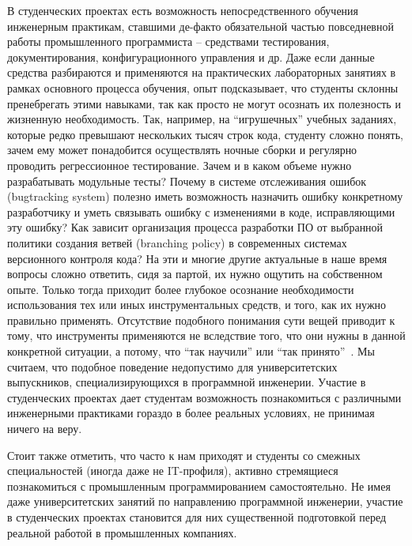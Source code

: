 \documentclass[a5paper]{article}
\begin{document}
В студенческих проектах есть возможность непосредственного обучения инженерным практикам, ставшими де-факто обязательной частью повседневной работы промышленного программиста -- средствами тестирования, документирования, конфигурационного управления и др. Даже если данные средства разбираются и применяются на практических лабораторных занятиях в рамках основного процесса обучения, опыт подсказывает, что студенты склонны пренебрегать этими навыками, так как просто не могут осознать их полезность и жизненную необходимость. Так, например, на ``игрушечных'' учебных заданиях, которые редко превышают нескольких тысяч строк кода, студенту сложно понять, зачем ему может понадобится осуществлять ночные сборки и регулярно проводить регрессионное тестирование. Зачем и в каком объеме нужно разрабатывать модульные тесты? Почему в системе отслеживания ошибок (bugtracking system) полезно иметь возможность назначить ошибку конкретному разработчику и уметь связывать ошибку с изменениями в коде, исправляющими эту ошибку? Как зависит организация процесса разработки ПО от выбранной политики создания ветвей (branching policy) в современных системах версионного контроля кода? На эти и многие другие актуальные в наше время вопросы сложно ответить, сидя за партой, их нужно ощутить на собственном опыте. Только тогда приходит более глубокое осознание необходимости использования тех или иных инструментальных средств, и того, как их нужно правильно применять. Отсутствие подобного понимания сути вещей приводит к тому, что инструменты применяются не вследствие того, что они нужны в данной конкретной ситуации, а потому, что ``так научили'' или ``так принято''~\cite{cargoCult}. Мы считаем, что подобное поведение недопустимо для университетских выпускников, специализирующихся в программной инженерии. Участие в студенческих проектах дает студентам возможность познакомиться с различными инженерными практиками гораздо в более реальных условиях, не принимая ничего на веру. 

Стоит также отметить, что часто к нам приходят и студенты со смежных специальностей (иногда даже не IT-профиля), активно стремящиеся познакомиться с промышленным программированием самостоятельно. Не имея даже университетских занятий по направлению программной инженерии, участие в студенческих проектах становится для них существенной подготовкой перед реальной работой в промышленных компаниях.
\end{document}
